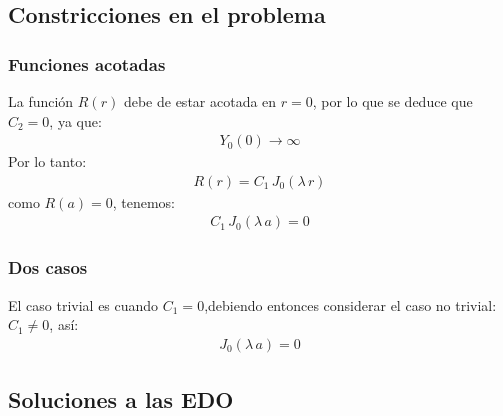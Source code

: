 \documentclass[12pt]{beamer}
\begin{document}
\subsection{Constricciones en el problema}

\begin{frame}
\frametitle{Funciones acotadas}
La función $R(r)$ debe de estar acotada en $r = 0$, por lo que se deduce que $C_{2} = 0$, ya que:
\begin{align*}
Y_{0}(0) \to \infty
\end{align*}
\pause
Por lo tanto:
\begin{align*}
R(r) = C_{1} \, J_{0}(\lambda \, r)
\end{align*}
\pause
como $R(a) = 0$, tenemos:
\begin{align*}
C_{1} \, J_{0} (\lambda \, a) = 0
\end{align*}
\end{frame}
\begin{frame}
\frametitle{Dos casos}
El caso trivial es cuando $C_{1} = 0$,\pause debiendo entonces considerar el caso no trivial: $C_{1} \neq 0$, así:
\begin{align}
J_{0} (\lambda \, a) = 0
\label{eq:ecuacion_CilBessel_05}
\end{align}
\end{frame}

\subsection{Soluciones a las EDO}
\end{document}
